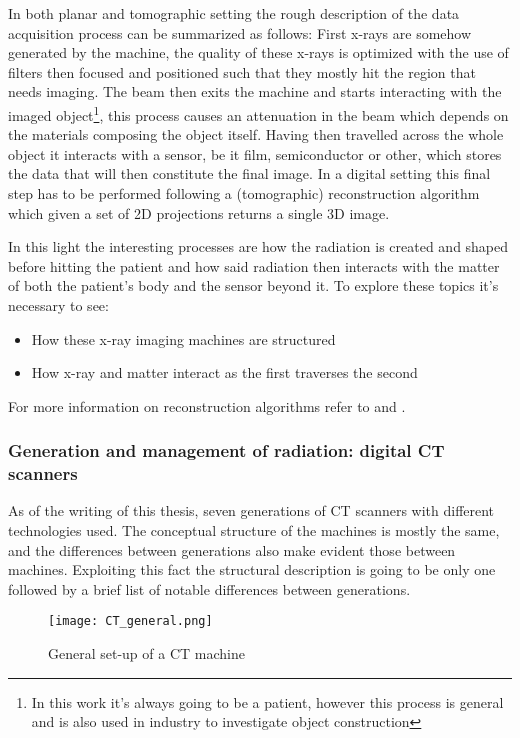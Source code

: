 In both planar and tomographic setting the rough description of the data acquisition process can be summarized as follows: First x-rays are somehow generated by the machine, the quality of these x-rays is optimized with the use of filters then focused and positioned such that they mostly hit the region that needs imaging. The beam then exits the machine and starts interacting with the imaged object\footnote{In this work it's always going to be a patient, however this process is general and is also used in industry to investigate object construction}, this process causes an attenuation in the beam which depends on the materials composing the object itself. Having then travelled across the whole object it interacts with a sensor, be it film, semiconductor or other, which stores the data that will then constitute the final image. In a digital setting this final step has to be performed following a (tomographic) reconstruction algorithm which given a set of 2D projections returns a single 3D image.

In this light the interesting processes are how the radiation is created and shaped before hitting the patient and how said radiation then interacts with the matter of both the patient's body and the sensor beyond it. To explore these topics it's necessary to see:

\begin{itemize}
\item How these x-ray imaging machines are structured
\item How x-ray and matter interact as the first traverses the second
\end{itemize}

For more information on reconstruction algorithms refer to \cite{xray_reconstruction} and \cite{PhysicsMedicalImaging}.

\subsubsection{Generation and management of radiation: digital CT scanners}

As of the writing of this thesis, seven generations of CT scanners with different technologies used. The conceptual structure of the machines is mostly the same, and the differences between generations also make evident those between machines. Exploiting this fact the structural description is going to be only one followed by a brief list of notable differences between generations.

\begin{figure}[H]
\centering
  		\texttt{[image: CT\_general.png]}
        \caption{General set-up of a CT machine\label{fig:CT-machine}}
\end{figure}


